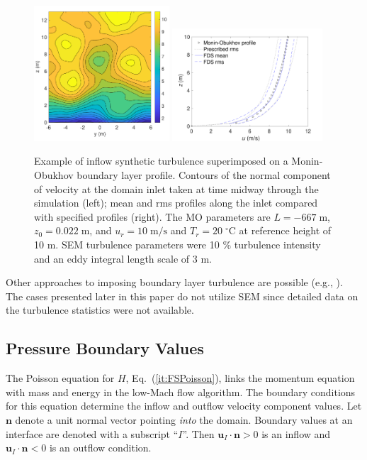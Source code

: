 \documentclass[journal,article,atmosphere,submit,moreauthors,pdftex]{Definitions/mdpi}
\begin{document}
\begin{figure}[ht]
\centering
\includegraphics[width=0.45\textwidth,valign=c]{figures/sem_open_wind_contours.pdf}
\includegraphics[width=0.5\textwidth,valign=c]{figures/sem_open_wind_u_prof.pdf}
\caption{Example of inflow synthetic turbulence superimposed on a Monin-Obukhov boundary layer profile. Contours of the normal component of velocity at the domain inlet taken at time midway through the simulation (left); mean and rms profiles along the inlet compared with specified profiles (right).  The MO parameters are $L=-667\;\mathrm{m}$, $z_0=0.022\;\mathrm{m}$, and $u_r=10\;\mathrm{m/s}$ and $T_r=20\;^\circ\mathrm{C}$ at reference height of 10 m.  SEM turbulence parameters were 10 \% turbulence intensity and an eddy integral length scale of 3 m.}
\label{fig:semprofs}
\end{figure}

Other approaches to imposing boundary layer turbulence are possible (e.g., \cite{Munoz-Esparza:2014}).  The cases presented later in this paper do not utilize SEM since detailed data on the turbulence statistics were not available.

\subsection{Pressure Boundary Values}

The Poisson equation for $H$, Eq.~(\ref{it:FSPoisson}), links the momentum equation with mass and energy in the low-Mach flow algorithm.  The boundary conditions for this equation determine the inflow and outflow velocity component values.  Let $\mathbf{n}$ denote a unit normal vector pointing \emph{into} the domain.  Boundary values at an interface are denoted with a subscript ``$I$''.  Then $\mathbf{u}_I\cdot\mathbf{n}>0$ is an inflow and $\mathbf{u}_I\cdot\mathbf{n}<0$ is an outflow condition.
\end{document}
